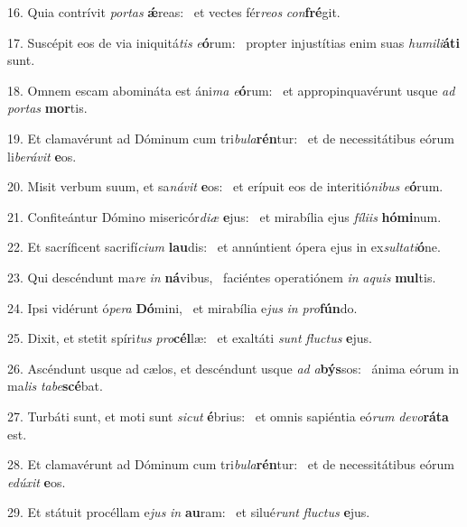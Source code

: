 16. Quia contrívit \textit{por}\textit{tas} \textbf{ǽ}reas: \ast\  et vectes fér\textit{re}\textit{os} \textit{con}\textbf{fré}git.\

17. Suscépit eos de via iniquitá\textit{tis} \textit{e}\textbf{ó}rum: \ast\  propter injustítias enim suas \textit{hu}\textit{mi}\textit{li}\textbf{á}\textbf{ti} sunt.\

18. Omnem escam abomináta est áni\textit{ma} \textit{e}\textbf{ó}rum: \ast\  et appropinquavérunt usque \textit{ad} \textit{por}\textit{tas} \textbf{mor}tis.\

19. Et clamavérunt ad Dóminum cum tri\textit{bu}\textit{la}\textbf{rén}tur: \ast\  et de necessitátibus eórum li\textit{be}\textit{rá}\textit{vit} \textbf{e}os.\

20. Misit verbum suum, et sa\textit{ná}\textit{vit} \textbf{e}os: \ast\  et erípuit eos de interitió\textit{ni}\textit{bus} \textit{e}\textbf{ó}rum.\

21. Confiteántur Dómino misericór\textit{di}\textit{æ} \textbf{e}jus: \ast\  et mirabília ejus \textit{fí}\textit{li}\textit{is} \textbf{hó}\textbf{mi}num.\

22. Et sacríficent sacrifí\textit{ci}\textit{um} \textbf{lau}dis: \ast\  et annúntient ópera ejus in ex\textit{sul}\textit{ta}\textit{ti}\textbf{ó}ne.\

23. Qui descéndunt ma\textit{re} \textit{in} \textbf{ná}vibus, \ast\  faciéntes operatiónem \textit{in} \textit{a}\textit{quis} \textbf{mul}tis.\

24. Ipsi vidérunt ó\textit{pe}\textit{ra} \textbf{Dó}mini, \ast\  et mirabília e\textit{jus} \textit{in} \textit{pro}\textbf{fún}do.\

25. Dixit, et stetit spíri\textit{tus} \textit{pro}\textbf{cél}læ: \ast\  et exaltáti \textit{sunt} \textit{fluc}\textit{tus} \textbf{e}jus.\

26. Ascéndunt usque ad cælos, et descéndunt usque \textit{ad} \textit{a}\textbf{býs}sos: \ast\  ánima eórum in ma\textit{lis} \textit{ta}\textit{be}\textbf{scé}bat.\

27. Turbáti sunt, et moti sunt \textit{sic}\textit{ut} \textbf{é}brius: \ast\  et omnis sapiéntia eó\textit{rum} \textit{de}\textit{vo}\textbf{rá}\textbf{ta} est.\

28. Et clamavérunt ad Dóminum cum tri\textit{bu}\textit{la}\textbf{rén}tur: \ast\  et de necessitátibus eórum \textit{e}\textit{dú}\textit{xit} \textbf{e}os.\

29. Et státuit procéllam e\textit{jus} \textit{in} \textbf{au}ram: \ast\  et silué\textit{runt} \textit{fluc}\textit{tus} \textbf{e}jus.\


